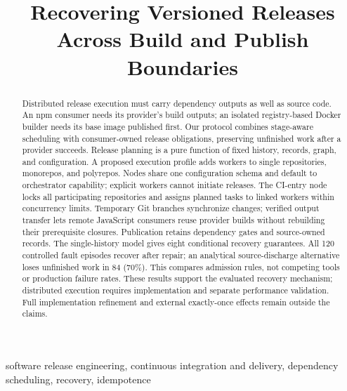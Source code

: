 \documentclass[10pt,conference]{IEEEtran}
\theoremstyle{definition}
\begin{document}
\title{Recovering Versioned Releases Across Build and Publish Boundaries}
\maketitle
\begin{abstract}
Distributed release execution must carry dependency outputs as well as source
code. An npm consumer needs its provider's build outputs; an isolated
registry-based Docker builder needs its base image published first. Our
protocol combines stage-aware scheduling with consumer-owned release
obligations, preserving unfinished work after a provider succeeds.
Release planning is a pure function of fixed history, records, graph, and
configuration. A proposed execution profile adds workers to single
repositories, monorepos, and polyrepos. Nodes share one configuration schema
and default to orchestrator capability; explicit workers cannot initiate
releases. The CI-entry node locks all participating repositories and assigns
planned tasks to linked workers within concurrency limits. Temporary Git
branches synchronize changes; verified output transfer lets remote JavaScript
consumers reuse provider builds without rebuilding their prerequisite
closures. Publication retains dependency gates and source-owned records.
The single-history model gives eight conditional recovery guarantees.
All 120 controlled fault episodes recover after repair; an analytical
source-discharge alternative loses unfinished work in 84 (70\%). This compares
admission rules, not competing tools or production failure rates. These results
support the evaluated recovery mechanism; distributed execution requires
implementation and separate performance validation. Full implementation
refinement and external exactly-once effects remain outside the claims.
\end{abstract}
\begin{IEEEkeywords}
software release engineering, continuous integration and delivery,
dependency scheduling, recovery, idempotence
\end{IEEEkeywords}






\clearpage
{}

\end{document}
